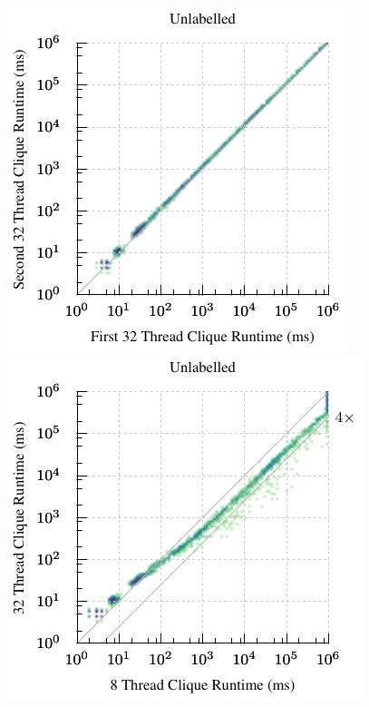 \documentclass{llncs}
\begin{document}
\begin{figure}[p]
    \centering
    \hspace*{1em}\includegraphics*[scale=0.7]{plots/plain-clique-par-repeat-heatmap.pdf}\hfill
    \includegraphics*[scale=0.7]{plots/plain-clique-par-8to32-heatmap.pdf}\hspace*{1em}


\end{figure}
\end{document}
